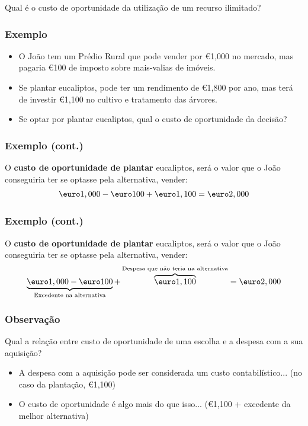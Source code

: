 \begin{frame}
	\begin{center}	
	{\huge Qual \'e o custo de oportunidade da utiliza\c c\~ao de um recurso ilimitado?}
	\end{center}
\end{frame}

\begin{frame}
	\frametitle{Exemplo}
	\begin{itemize}
		\item O Jo\~ao tem um Pr\'edio Rural que pode vender por \euro1,000 no mercado, mas pagaria \euro100 de imposto sobre mais-valias de im\'oveis.\pause
		\item Se plantar eucaliptos, pode ter um rendimento de \euro1,800 por ano, mas ter\'a de investir \euro1,100 no cultivo e tratamento das \'arvores.
		\item Se optar por plantar eucaliptos, qual o custo de oportunidade da decis\~ao?
	\end{itemize}
\end{frame}

\begin{frame}
	\frametitle{Exemplo (cont.)}
	O \textbf{custo de oportunidade de plantar} eucaliptos, ser\'a o valor que o Jo\~ao conseguiria ter se optasse pela alternativa, vender:
	\begin{align}
		\textup{\euro} 1,000 - \textup{\euro} 100 + \textup{\euro} 1,100 = \textup{\euro} 2,000
	\end{align}
\end{frame}

\begin{frame}
	\frametitle{Exemplo (cont.)}
	O \textbf{custo de oportunidade de plantar} eucaliptos, ser\'a o valor que o Jo\~ao conseguiria ter se optasse pela alternativa, vender:
	\begin{align}
		\underbrace{\textup{\euro} 1,000 - \textup{\euro} 100}_{\text{Excedente na alternativa}} + \overbrace{\textup{\euro} 1,100}^{\text{Despesa que n\~ao teria na alternativa}} = \textup{\euro} 2,000
	\end{align}
\end{frame}

\begin{frame}
	\frametitle{Observa\c c\~ao}

	Qual a rela\c c\~ao entre custo de oportunidade de uma escolha e a despesa com a sua aquisi\c c\~ao? \pause

	\begin{itemize}
		\item A despesa com a aquisi\c c\~ao pode ser considerada um custo contabil\'istico... (no caso da planta\c c\~ao, \euro 1,100) \pause
		\item O custo de oportunidade \'e algo mais do que isso... (\euro 1,100 + excedente da melhor alternativa)
	\end{itemize}

\end{frame}

